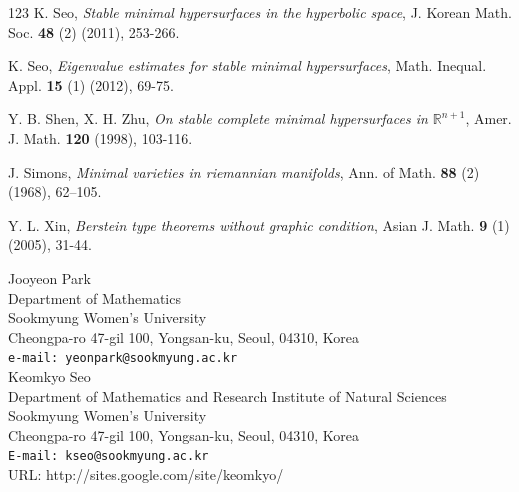 \documentclass[amssymb,amstex,amsmath,11pt]{article}
\numberwithin{equation}{section}
\theoremstyle{plain}
\theoremstyle{definition}
\theoremstyle{remark}
\begin{document}
\begin{thebibliography}{123}
 K. Seo, \textit{Stable minimal hypersurfaces in the hyperbolic space}, J. Korean Math. Soc. {\bf 48} (2) (2011), 253-266.

 K. Seo, \textit{Eigenvalue estimates for stable minimal hypersurfaces}, Math. Inequal. Appl. {\bf 15} (1) (2012), 69-75.

 Y. B. Shen, X. H. Zhu, \textit{On stable complete minimal hypersurfaces in $\mathbb{R}^{n+1}$}, Amer. J. Math. {\bf 120} (1998), 103-116.

 J. Simons, \textit{Minimal varieties in riemannian manifolds}, Ann. of Math. {\bf 88} (2) (1968), 62–105.


 Y. L. Xin, \textit{Berstein type theorems without graphic condition}, Asian J. Math. {\bf 9} (1) (2005), 31-44.

\end{thebibliography}



\vskip 1cm
\noindent Jooyeon Park\\
Department of Mathematics\\
Sookmyung Women's University \\
Cheongpa-ro 47-gil 100, Yongsan-ku, Seoul, 04310, Korea \\
{\tt e-mail: yeonpark@sookmyung.ac.kr}\\


\bigskip
\noindent Keomkyo Seo\\
Department of Mathematics and Research Institute of Natural Sciences\\
Sookmyung Women's University\\
Cheongpa-ro 47-gil 100, Yongsan-ku, Seoul, 04310, Korea \\
{\tt E-mail: kseo@sookmyung.ac.kr}\\
URL: http://sites.google.com/site/keomkyo/
\end{document}
